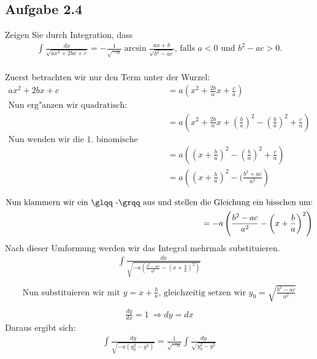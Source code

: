 \documentclass{theozettel}
\begin{document}
\subsection*{Aufgabe 2.4} Zeigen Sie durch Integration, dass
\begin{align*}
\int{\frac{dx}{\sqrt{ax^2+2bx+c}}}=- \frac{1}{\sqrt{-a}}\arcsin{\frac{ax+b}{\sqrt{b^2-ac}}} \text{, falls $a<0$ und $b^2 -ac>0$.}
\end{align*}\\
Zuerst betrachten wir nur den Term unter der Wurzel:
\begin{align*}
ax^2+2bx+c&=a\left(x^2+\frac{2b}{a}x+\frac{c}{a}\right)\\
\text{Nun erg"anzen wir quadratisch:}\\
&=a\left(x^2+\frac{2b}{a}x+\left(\frac{b}{a}\right)^2-\left(\frac{b}{a}\right)^2+\frac{c}{a}\right)\\
\text{Nun wenden wir die 1. binomische Formel an:}\\
&= a\left(\left( x+\frac{b}{a} \right)^2 - \left(\frac{b}{a}\right)^2+\frac{c}{a}\right)\\
&= a\left(\left( x+\frac{b}{a} \right)^2- (\frac{b^2+ac}{a^2}\right)\\
\end{align*}
\begin{align*}
\text{Nun klammern wir ein \glqq -\grqq aus und stellen die Gleichung ein bisschen um:}\\
= -a\left(\frac{b^2-ac}{a^2} - \left( x+\frac{b}{a} \right)^2 \right)\\
\end{align*}
Nach dieser Umformung werden wir das Integral mehrmals substituieren.
\begin{align*}
\int{\frac{dx}{\sqrt{-a\left(\frac{b^2-ac}{a^2} - \left( x+\frac{b}{a} \right)^2 \right)}}}\\
\end{align*} 
\begin{align*}
\text{Nun substituieren wir mit $y= x + \frac{b}{a}$, gleichzeitig setzen wir $y_0 = \sqrt{\frac{b^2-ac}{a^2}}$}\\
\end{align*}
\begin{align*}
\frac{dy}{dx} = 1 \ \Rightarrow dy=dx
\end{align*} 
Daraus ergibt sich:
\begin{align*}
\int{\frac{dy}{\sqrt{-a\left(y_0^2-y^2\right)}}}=\frac{1}{\sqrt{-a}}\int{\frac{dy}{\sqrt{y_0^2-y^2}}}
\end{align*}
\end{document}
